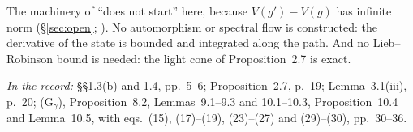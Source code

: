 \begin{context}
The machinery of \cite{Hastings,BMNS} ``does not start'' here, because $V(g')-V(g)$ has
infinite norm (\S\ref{sec:open}; ). No automorphism or spectral flow is
constructed: the derivative of the state is bounded and integrated along the path. And
no Lieb--Robinson bound is needed: the light cone of Proposition~2.7 is exact.
\end{context}

\noindent\emph{In the record:} \S\S1.3(b) and 1.4, pp.~5--6; Proposition~2.7, p.~19;
Lemma~3.1(iii), p.~20; (G$_\gamma$), Proposition~8.2, Lemmas~9.1--9.3 and 10.1--10.3,
Proposition~10.4 and Lemma~10.5, with eqs.~(15), (17)--(19), (23)--(27) and (29)--(30),
pp.~30--36.
